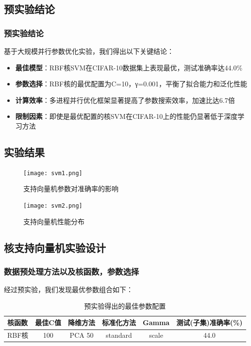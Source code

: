 \documentclass[UTF8]{report}
\theoremstyle{MyLineTheoremStyle} %
\theoremstyle{MyBlockTheoremStyle} %
\theoremstyle{MySubsubsectionStyle} %
\begin{document}
\subsection{预实验结论}

\subsubsection{预实验结论}

基于大规模并行参数优化实验，我们得出以下关键结论：
\begin{itemize}
    \item \textbf{最佳模型}：RBF核SVM在CIFAR-10数据集上表现最优，测试准确率达44.0\%
    \item \textbf{参数选择}：RBF核的最优配置为C=10，γ=0.001，平衡了拟合能力和泛化性能
    \item \textbf{计算效率}：多进程并行优化框架显著提高了参数搜索效率，加速比达6.7倍
    \item \textbf{限制因素}：即使是最优配置的核SVM在CIFAR-10上的性能仍显著低于深度学习方法
\end{itemize}

\subsection{实验结果}

\begin{figure}[H]
    \centering
    \texttt{[image: svm1.png]}
    \caption{支持向量机参数对准确率的影响}
    \label{fig:svm_confusion_matrix}
\end{figure}

\begin{figure}[H]
    \centering
    \texttt{[image: svm2.png]}
    \caption{支持向量机性能分布}
    \label{fig:svm_class_accuracy}
\end{figure}

\subsection{核支持向量机实验设计}
\subsubsection{数据预处理方法以及核函数，参数选择}
经过预实验，我们发现最优参数组合如下：
\begin{table}[h]
\centering
\caption{预实验得出的最佳参数配置}
\begin{tabular}{l c c c c c}
\toprule
\textbf{核函数} & \textbf{最佳C值} & \textbf{降维方法} & \textbf{标准化方法} & \textbf{Gamma} & \textbf{测试(子集)准确率(\%)} \\
\midrule
RBF核 & 100 & PCA  50& standard & scale & 44.0 \\
\bottomrule
\end{tabular}
\end{table}
\label{sec:svm_results_analysis}
\end{document}
